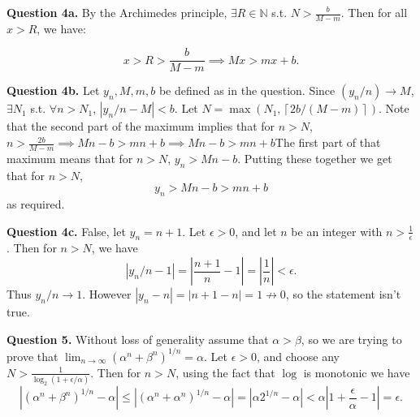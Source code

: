 \documentclass[letterpaper, reqno,11pt]{article}
\begin{document}
\newpage\phantom{blabla}
\newpage

{\medskip\noindent\bf Question 4a.} By the Archimedes principle, $\exists R\in \mathbb{N}$ s.t. $N>\frac{b}{M-m}$. Then for all $x>R$, we have:

\[
x>R>\frac{b}{M-m}\implies Mx>mx+b
.\]

{\medskip\noindent\bf Question 4b.} Let $y_n, M,m,b$ be defined as in the question. Since $(y_n /n)\to M$, $\exists N_1$ s.t. $\forall n>N_1$, $\left| y_n /n -M \right|< b$. Let $N=\max\left( N_1, \left\lceil 2b /(M-m) \right\rceil  \right) $. Note that the second part of the maximum implies that for $n>N$, $n>\frac{2b}{M-m}\implies Mn-b >mn+b\implies Mn-b>mn+b$The first part of that maximum means that for $n>N$, $y_n>Mn-b$. Putting these together we get that for $n>N$,
\[
y_n>Mn-b>mn+b
\]
as required.

{\medskip\noindent\bf Question 4c.} False, let $y_n=n+1$. Let $\epsilon>0$, and let $n$ be an integer with $n>\frac{1}{\epsilon}$. Then for $n>N$, we have
\[
|y_n /n - 1|= \left| \frac{n+1}{n}-1 \right|=\left| \frac{1}{n} \right| <\epsilon
.\]
Thus $y_n/n\to 1$. However $|y_n-n|=|n+1-n|=1\not\to 0$, so the statement isn't true.

\newpage\phantom{blabla}
\newpage


{\medskip\noindent\bf Question 5.} Without loss of generality assume that $\alpha>\beta$, so we are trying to prove that $\lim_{n\to\infty}\left( \alpha ^{n}+\beta^{n} \right)^{1 /n} =\alpha$. Let $\epsilon>0$, and choose any $N>\frac{1}{\log_2 (1+\epsilon/\alpha)}$. Then for $n>N$, using the fact that $\log$ is monotonic we have
\[
\left| \left( \alpha ^{n}+\beta^{n} \right)^{1 /n}-\alpha \right|\leq \left| \left( \alpha ^{n}+\alpha ^{n} \right) ^{1 /n}-\alpha \right| = \left| \alpha 2^{1 /n}-\alpha \right| <\alpha \left| 1+\frac{\epsilon}{\alpha}-1 \right| =\epsilon
.\]
\end{document}
